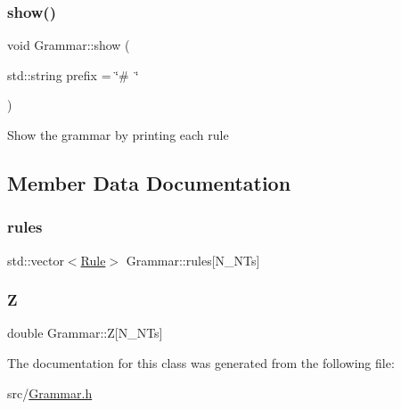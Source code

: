 \subsubsection{\texorpdfstring{show()}{show()}}
{\footnotesize\ttfamily void Grammar\+::show (\begin{DoxyParamCaption}\item[{std\+::string}]{prefix = {\ttfamily \char`\"{}\#~\char`\"{}} }\end{DoxyParamCaption})\hspace{0.3cm}{\ttfamily [inline]}}

Show the grammar by printing each rule

\subsection{Member Data Documentation}
\mbox{\label{class_grammar_aae1036bcd35025ff7512252c7aa06e9c}} 
\subsubsection{\texorpdfstring{rules}{rules}}
{\footnotesize\ttfamily std\+::vector$<$\hyperlink{class_rule}{Rule}$>$ Grammar\+::rules\mbox{[}N\+\_\+\+N\+Ts\mbox{]}\hspace{0.3cm}{\ttfamily [protected]}}

\mbox{\label{class_grammar_af55b1376566113fecd05b2c99b9f0014}} 
\subsubsection{\texorpdfstring{Z}{Z}}
{\footnotesize\ttfamily double Grammar\+::Z\mbox{[}N\+\_\+\+N\+Ts\mbox{]}\hspace{0.3cm}{\ttfamily [protected]}}



The documentation for this class was generated from the following file\+:\begin{DoxyCompactItemize}
\item 
src/\hyperlink{_grammar_8h}{Grammar.\+h}\end{DoxyCompactItemize}
